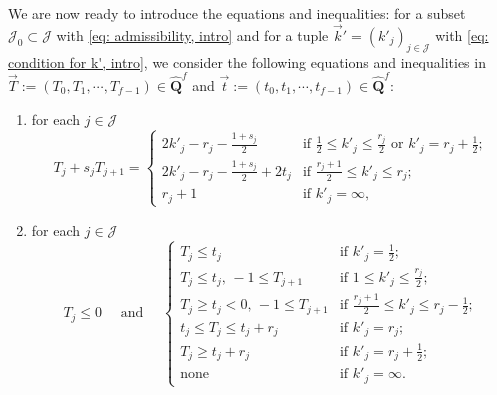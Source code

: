 \documentclass[11pt]{amsart}
\theoremstyle{definition}
\numberwithin{equation}{subsection}
\theoremstyle{plain}
\theoremstyle{plain}
\theoremstyle{plain}
\theoremstyle{plain}
\theoremstyle{plain}
\theoremstyle{plain}
\theoremstyle{plain}
\theoremstyle{plain}
\theoremstyle{plain}
\theoremstyle{plain}
\theoremstyle{plain}
\theoremstyle{plain}
\theoremstyle{definition}
\theoremstyle{definition}
\theoremstyle{definition}
\theoremstyle{remark}
\renewcommand{\(}{\textup{(}}
\renewcommand{\)}{\textup{)}}
\newcommand{\Q}{\mathbf{Q}}
\newcommand{\cJ}{\mathcal{J}}
\newcommand{\vk}{\vec{k}}
\begin{document}
We are now ready to introduce the equations and inequalities: for a subset $\cJ_0\subset\cJ$ with \eqref{eq: admissibility, intro} and for a tuple $\vk'=(k'_j)_{j\in\cJ}$ with \eqref{eq: condition for k', intro}, we consider the following equations and inequalities in $\vec{T}:=(T_0,T_1,\cdots,T_{f-1})\in \hat{\Q}^f$ and $\vec{t}:=(t_0,t_1,\cdots,t_{f-1})\in\hat{\Q}^f$:
\begin{enumerate}[leftmargin=*]
\item[\textbf{A}.] for each $j\in\cJ$
        \begin{equation*}
            T_j+s_jT_{j+1}
            =
            \begin{cases}
                2k'_j-r_j-\frac{1+s_j}{2} & \mbox{if } \frac{1}{2}\leq k'_j\leq \frac{r_j}{2}\,\,\mbox{or}\,\,k'_j=r_j+\frac{1}{2};\\
                2k'_j-r_j-\frac{1+s_j}{2}+2t_j  & \mbox{if } \frac{r_j+1}{2}\leq k'_j\leq r_j;\\
                r_j+1 & \mbox{if } k'_j=\infty,
            \end{cases}
        \end{equation*}
\item[\textbf{B}.] for each $j\in\cJ$
        \begin{equation*}
           T_j\leq 0\quad\mbox{ and }\quad
            \begin{cases}
                T_j\leq t_j  & \mbox{if }k'_j=\frac{1}{2};\\
                T_j\leq t_j,\, -1\leq T_{j+1} & \mbox{if } 1\leq k'_j\leq \frac{r_j}{2};\\
                T_j\geq t_j<0,\, -1\leq T_{j+1} &\mbox{if } \frac{r_j+1}{2}\leq k'_j\leq r_j-\frac{1}{2};\\
                t_j\leq T_j\leq t_j+r_j &\mbox{if }k'_j=r_j;\\
                T_j\geq t_j+r_j &\mbox{if }k'_j=r_j+\frac{1}{2};\\
                \mbox{none} &\mbox{if }k'_j=\infty.
            \end{cases}
        \end{equation*}
\end{enumerate}
\end{document}
